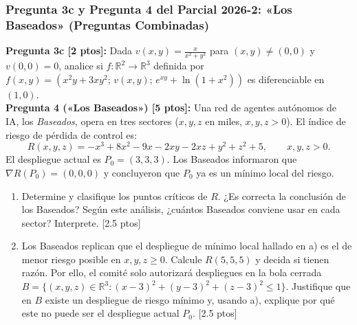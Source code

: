 \documentclass[11pt,a4paper]{article}
\begin{document}
\subsubsection*{Pregunta 3c y Pregunta 4 del Parcial 2026-2: «Los Baseados» (Preguntas Combinadas)}
\begin{tcolorbox}[colback=white,colframe=gray!40,arc=1mm,boxrule=0.5pt]
\textbf{Pregunta 3c [2 ptos]:} Dada $v(x,y) = \frac{x}{x^2+y^2}$ para $(x,y)\neq(0,0)$ y $v(0,0)=0$, analice si $f: \mathbb{R}^2 \to \mathbb{R}^3$ definida por $f(x,y) = \left(x^2y+3xy^2; \, v(x,y); \, e^{xy}+\ln(1+x^2)\right)$ es diferenciable en $(1,0)$.\\[4pt]
\textbf{Pregunta 4 («Los Baseados») [5 ptos]:} Una red de agentes autónomos de IA, los \emph{Baseados}, opera en tres sectores ($x,y,z$ en miles, $x,y,z > 0$). El índice de riesgo de pérdida de control es:
\[ R(x,y,z) = -x^3 + 8x^2 - 9x - 2xy - 2xz + y^2 + z^2 + 5, \qquad x,y,z > 0. \]
El despliegue actual es $P_0 = (3,3,3)$. Los Baseados informaron que $\nabla R(P_0) = (0,0,0)$ y concluyeron que $P_0$ ya es un mínimo local del riesgo.
\begin{enumerate}[label=\textbf{\alph*)}]
  \item Determine y clasifique los puntos críticos de $R$. ¿Es correcta la conclusión de los Baseados? Según este análisis, ¿cuántos Baseados conviene usar en cada sector? Interprete. \hfill [2.5 ptos]
  \item Los Baseados replican que el despliegue de mínimo local hallado en a) es el de menor riesgo posible en $x,y,z \ge 0$. Calcule $R(5,5,5)$ y decida si tienen razón. Por ello, el comité solo autorizará despliegues en la bola cerrada $B = \{(x,y,z)\in\mathbb{R}^3 : (x-3)^2+(y-3)^2+(z-3)^2 \le 1\}$. Justifique que en $B$ existe un despliegue de riesgo mínimo y, usando a), explique por qué este no puede ser el despliegue actual $P_0$. \hfill [2.5 ptos]
\end{enumerate}
\end{tcolorbox}
\end{document}
